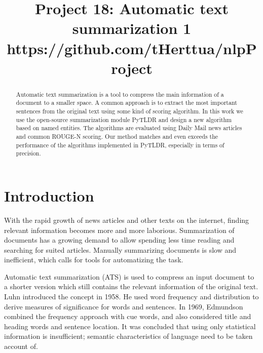 \documentclass[conference]{IEEEtran}
\begin{document}
\title{Project 18: Automatic text summarization 1\\
{\footnotesize https://github.com/tHerttua/nlpProject
}
}

\author{
	\IEEEauthorblockA{}
\and
{}
\IEEEauthorblockA{}
\and
{}
\IEEEauthorblockA{}
\and
{}
\IEEEauthorblockA{}
}

\maketitle

\begin{abstract}
Automatic text summarization is a tool to compress the main information of a document to a smaller space. A common approach is to extract the most important sentences from the original text using some kind of scoring algorithm. In this work we use the open-source summarization module PyTLDR and design a new algorithm based on named entities. The algorithms are evaluated using Daily Mail news articles and common ROUGE-N scoring. Our method matches and even exceeds the performance of the algorithms implemented in PyTLDR, especially in terms of precision.
\end{abstract}

\section{Introduction}
With the rapid growth of news articles and other texts on the internet, finding relevant information becomes more and more laborious. Summarization of documents has a growing demand to allow spending less time reading and searching for suited articles. Manually summarizing documents is slow and inefficient, which calls for tools for automatizing the task.

Automatic text summarization (ATS) is used to compress an input document to a shorter version which still contains the relevant information of the original text. Luhn \cite{luhn1958} introduced the concept in 1958. He used word frequency and distribution to derive measures of significance for words and sentences. In 1969, Edmundson \cite{edmundson1969} combined the frequency approach with cue words, and also considered title and heading words and sentence location. It was concluded that using only statistical information is insufficient; semantic characteristics of language need to be taken account of. 
\end{document}
